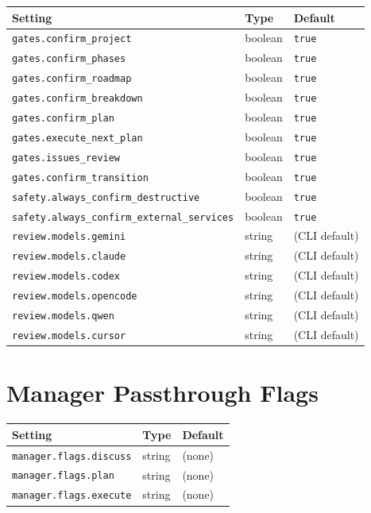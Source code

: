 \documentclass[10pt,letterpaper]{article}
\begin{document}
\begin{longtable}{@{}l l l@{}}
\toprule
\textbf{\footnotesize Setting} & \textbf{\footnotesize Type} & \textbf{\footnotesize Default} \\
\midrule
\endhead
\texttt{gates.confirm\_project} & boolean & \texttt{true} \\
\texttt{gates.confirm\_phases} & boolean & \texttt{true} \\
\texttt{gates.confirm\_roadmap} & boolean & \texttt{true} \\
\texttt{gates.confirm\_breakdown} & boolean & \texttt{true} \\
\texttt{gates.confirm\_plan} & boolean & \texttt{true} \\
\texttt{gates.execute\_next\_plan} & boolean & \texttt{true} \\
\texttt{gates.issues\_review} & boolean & \texttt{true} \\
\texttt{gates.confirm\_transition} & boolean & \texttt{true} \\
\texttt{safety.always\_confirm\_destructive} & boolean & \texttt{true} \\
\texttt{safety.always\_confirm\_external\_services} & boolean & \texttt{true} \\
\texttt{review.models.gemini} & string & (CLI default) \\
\texttt{review.models.claude} & string & (CLI default) \\
\texttt{review.models.codex} & string & (CLI default) \\
\texttt{review.models.opencode} & string & (CLI default) \\
\texttt{review.models.qwen} & string & (CLI default) \\
\texttt{review.models.cursor} & string & (CLI default) \\
\bottomrule
\end{longtable}

\section{Manager Passthrough Flags}

\begin{longtable}{@{}l l l@{}}
\toprule
\textbf{\footnotesize Setting} & \textbf{\footnotesize Type} & \textbf{\footnotesize Default} \\
\midrule
\endhead
\texttt{manager.flags.discuss} & string & (none) \\
\texttt{manager.flags.plan} & string & (none) \\
\texttt{manager.flags.execute} & string & (none) \\
\bottomrule
\end{longtable}
\end{document}
